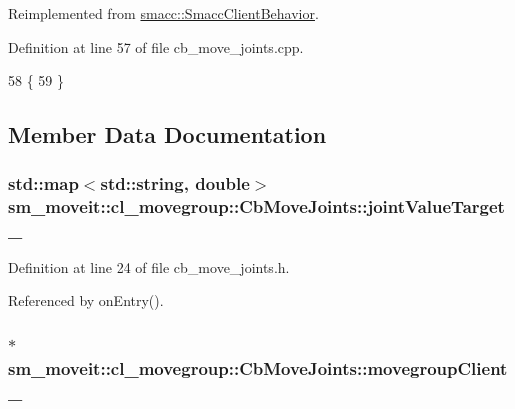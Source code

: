 Reimplemented from \hyperlink{classsmacc_1_1SmaccClientBehavior_ac0cd72d42bd00425362a97c9803ecce5}{smacc\+::\+Smacc\+Client\+Behavior}.



Definition at line 57 of file cb\+\_\+move\+\_\+joints.\+cpp.


\begin{DoxyCode}
58 \{
59 \}
\end{DoxyCode}


\subsection{Member Data Documentation}
\subsubsection[{\texorpdfstring{joint\+Value\+Target\+\_\+}{jointValueTarget_}}]{\setlength{\rightskip}{0pt plus 5cm}std\+::map$<$std\+::string, double$>$ sm\+\_\+moveit\+::cl\+\_\+movegroup\+::\+Cb\+Move\+Joints\+::joint\+Value\+Target\+\_\+}\hypertarget{classsm__moveit_1_1cl__movegroup_1_1CbMoveJoints_a86f4b67097288bcf5ccbe615751705d7}{}\label{classsm__moveit_1_1cl__movegroup_1_1CbMoveJoints_a86f4b67097288bcf5ccbe615751705d7}


Definition at line 24 of file cb\+\_\+move\+\_\+joints.\+h.



Referenced by on\+Entry().

\subsubsection[{\texorpdfstring{movegroup\+Client\+\_\+}{movegroupClient_}}]{$\ast$ sm\+\_\+moveit\+::cl\+\_\+movegroup\+::\+Cb\+Move\+Joints\+::movegroup\+Client\+\_\+\hspace{0.3cm}{\ttfamily [private]}}\hypertarget{classsm__moveit_1_1cl__movegroup_1_1CbMoveJoints_a3994694b9e783bc376e3eabffc214001}{}\label{classsm__moveit_1_1cl__movegroup_1_1CbMoveJoints_a3994694b9e783bc376e3eabffc214001}


